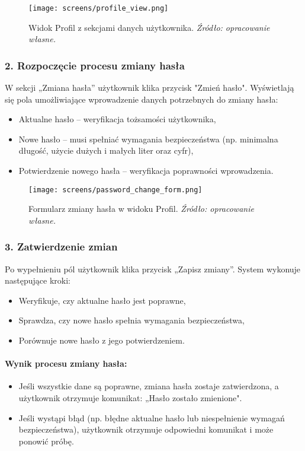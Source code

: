 \documentclass[12pt,a4paper,oneside]{article}
\theoremstyle{definition}
\numberwithin{equation}{section}
\begin{document}
\begin{figure}[H]
    \centering
    \texttt{[image: screens/profile\_view.png]}
    \caption{Widok Profil z sekcjami danych użytkownika. \emph{Źródło: opracowanie własne.}}
    \label{fig:profile_view_tutorial}
\end{figure}

\subsubsection*{\textbf{2. Rozpoczęcie procesu zmiany hasła}}
W sekcji „Zmiana hasła” użytkownik klika przycisk "Zmień hasło". Wyświetlają się pola umożliwiające wprowadzenie danych potrzebnych do zmiany hasła:
\begin{itemize}
    \item Aktualne hasło – weryfikacja tożsamości użytkownika,
    \item Nowe hasło – musi spełniać wymagania bezpieczeństwa (np. minimalna długość, użycie dużych i małych liter oraz cyfr),
    \item Potwierdzenie nowego hasła – weryfikacja poprawności wprowadzenia.
\end{itemize}

\begin{figure}[H]
    \centering
    \texttt{[image: screens/password\_change\_form.png]}
    \caption{Formularz zmiany hasła w widoku Profil. \emph{Źródło: opracowanie własne.}}
    \label{fig:password_change_form}
\end{figure}

\subsubsection*{\textbf{3. Zatwierdzenie zmian}}
Po wypełnieniu pól użytkownik klika przycisk „Zapisz zmiany”. System wykonuje następujące kroki:
\begin{itemize}
    \item Weryfikuje, czy aktualne hasło jest poprawne,
    \item Sprawdza, czy nowe hasło spełnia wymagania bezpieczeństwa,
    \item Porównuje nowe hasło z jego potwierdzeniem.
\end{itemize}

\paragraph{Wynik procesu zmiany hasła:}
\begin{itemize}
    \item Jeśli wszystkie dane są poprawne, zmiana hasła zostaje zatwierdzona, a użytkownik otrzymuje komunikat: „Hasło zostało zmienione".
    \item Jeśli wystąpi błąd (np. błędne aktualne hasło lub niespełnienie wymagań bezpieczeństwa), użytkownik otrzymuje odpowiedni komunikat i może ponowić próbę.
\end{itemize}
\end{document}

